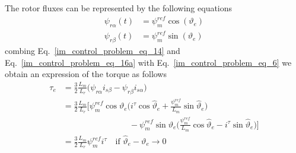 \documentclass[11pt,a4paper,oneside]{book}
\numberwithin{equation}{section}
\theoremstyle{it}
\theoremstyle{definition}
\begin{document}
The rotor fluxes can be represented by the following equations
\begin{equation}\label{im_control_problem_eq_16a}
	\begin{aligned}
		\psi_{r\alpha}(t) &= \psi_m^{ref}\cos(\vartheta_{e}) \\[6pt]
		\psi_{r\beta}(t) &= \psi_m^{ref}\sin(\vartheta_{e})
	\end{aligned}
\end{equation}
combing Eq.~\eqref{im_control_problem_eq_14} and Eq.~\eqref{im_control_problem_eq_16a} with Eq.~\eqref{im_control_problem_eq_6} we obtain an expression of the torque as follows
\begin{equation}\label{im_control_problem_eq_16b}
	\begin{aligned}
		\tau_e &= \frac{3}{2}\frac{L_m}{L_r}\Big(\psi_{r\alpha}i_{s\beta} - 	\psi_{r\beta}i_{s\alpha}\Big) \\[6pt]
		&=\frac{3}{2}\frac{L_m}{L_r}\Bigg[\psi_m^{ref}\cos\vartheta_{e}\Big(i^\tau\cos\hat{\vartheta}_{e}+\frac{\psi_m^{ref}}{L_m}\sin\hat{\vartheta}_{e}\Big) \\[6pt] &\qquad\qquad\qquad\qquad - \psi_m^{ref}\sin\vartheta_{e} \Big(\frac{\psi_m^{ref}}{L_m}\cos\hat{\vartheta}_{e}-i^\tau\sin\hat{\vartheta}_e\Big)\Bigg] \\[6pt]
		&= \frac{3}{2}\frac{L_m}{L_r}\psi_m^{ref}i^\tau \quad\text{if }\hat{\vartheta}_e-\vartheta_{e}\rightarrow0
	\end{aligned}
\end{equation}
\end{document}
